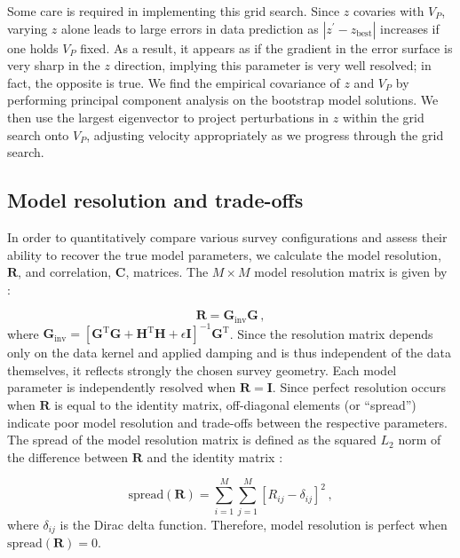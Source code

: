 \documentclass[10pt,titlepage]{article}
\begin{document}
Some care is required in implementing this grid search. Since $z$ covaries with $V_P$, varying $z$ alone leads to large errors in data prediction as $|z^{\prime}-z_{{\text{best}}}|$ increases if one holds $V_P$ fixed. As a result, it appears as if the gradient in the error surface is very sharp in the $z$ direction, implying this parameter is very well resolved; in fact, the opposite is true. We find the empirical covariance of $z$ and $V_P$ by performing principal component analysis on the bootstrap model solutions. We then use the largest eigenvector to project perturbations in $z$ within the grid search onto $V_P$, adjusting velocity appropriately as we progress through the grid search. 

\subsection{Model resolution and trade-offs}
In order to quantitatively compare various survey configurations and assess their ability to recover the true model parameters, we calculate the model resolution, $\mathbf{R}$, and correlation, $\mathbf{C}$, matrices. The $M \times M$ model resolution matrix is given by \citep{Menke2018}:

\begin{equation}
\mathbf{R} = \mathbf{G}_{\text{inv}} \mathbf{G} \,,
\end{equation}
where $\mathbf{G}_{\text{inv}}= \left[ \mathbf{G}^{\text{T}} \mathbf{G} + \mathbf{H}^{\text{T}} \mathbf{H} + \epsilon\mathbf{I} \right]^{-1} \mathbf{G}^{\text{T}}$. Since the resolution matrix depends only on the data kernel and applied damping and is thus independent of the data themselves, it reflects strongly the chosen survey geometry. Each model parameter is independently resolved when $\mathbf{R}=\mathbf{I}$. Since perfect resolution occurs when $\mathbf{R}$ is equal to the identity matrix, off-diagonal elements (or ``spread'') indicate poor model resolution and trade-offs between the respective parameters. The spread of the model resolution matrix is defined as the squared $L_2$ norm of the difference between $\mathbf{R}$ and the identity matrix \citep{Menke2018}:

\begin{equation}
\text{spread}(\mathbf{R}) = \sum_{i=1}^M\sum_{j=1}^M \left[ R_{ij}-\delta_{ij}\right]^2 \,,
\end{equation}
where $\delta_{ij}$ is the Dirac delta function. Therefore, model resolution is perfect when $\text{spread}(\mathbf{R})=0$.
\end{document}
